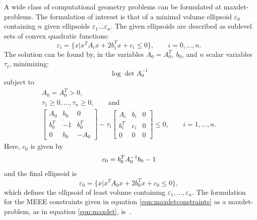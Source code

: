 A wide class of computational geometry problems can be formulated at maxdet-problems. The formulation of interest is
that of a minimal volume ellipsoid $\varepsilon_0$ containing $n$ given ellipsoids $\varepsilon_1\dots\varepsilon_n$. The
given ellipsoids are described as sublevel sets of convex quadratic functions:~\cite{vandenberghe96,boyd04}
\begin{equation}\label{eqn:ellipse}
    \varepsilon_i = \{ x | x^TA_ix + 2b_i^Tx + c_i \leq 0 \},\qquad i=0,\dots,n.
\end{equation}
The solution can be found by, in the variables $A_0 = A_0^T$, $b_0$, and
$n$ scalar variables $\tau_i$, minimizing:~\cite{vandenberghe96}
\begin{equation}\label{eqn:maxdetfun}
    \log\det A_0^{-1}
\end{equation}
subject to
\begin{equation}\label{eqn:maxdetconstraints}
    \begin{array}{l}
    A_0 = A_0^T > 0 ,\\
    \tau_1 \geq 0,\dots,\tau_n\geq 0 ,\qquad\text{and}\\
    \left[ \begin{array}{ccc}
        A_0   & b_0 &  0     \\
        b_0^T & -1  & b_0^T  \\
        0     & b_0 & -A_0
    \end{array} \right]
    -\tau_i
    \left[ \begin{array}{ccc}
        A_i   & b_i & 0 \\
        b_i^T & c_i & 0 \\
        0     &   0 & 0 
    \end{array} \right]
    \leq 0,\qquad i=1,\dots,n.
    \end{array}
\end{equation}
Here, $c_0$ is given by~\cite{boyd94}
\begin{equation}
    c_0=b_0^TA_0^{-1}b_0-1\\
\end{equation}
and the final ellipsoid is
\begin{equation}
    \varepsilon_0=\{x|x^TA_0x+2b_0^Tx+c_0\leq 0\},
\end{equation}
which defines the ellipsoid of least volume containing $\varepsilon_1,\dots,\varepsilon_n$. The formulation for the MEEE
constraints given in equation \ref{eqn:maxdetconstraints} as a maxdet-problem, as in equation \ref{eqn:maxdet}, 
is~\cite{vandenberghe96}.
